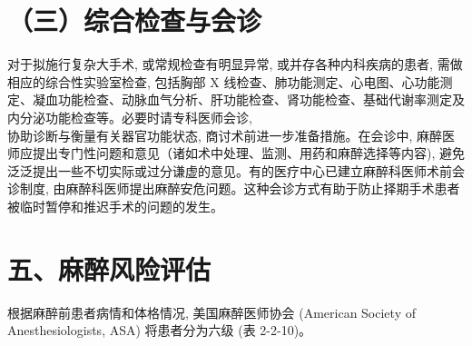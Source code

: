 \documentclass[10pt]{article}
\begin{document}
\section*{（三）综合检查与会诊}
对于拟施行复杂大手术, 或常规检查有明显异常, 或并存各种内科疾病的患者, 需做相应的综合性实验室检查, 包括胸部 X 线检查、肺功能测定、心电图、心功能测定、凝血功能检查、动脉血气分析、肝功能检查、肾功能检查、基础代谢率测定及内分泌功能检查等。必要时请专科医师会诊,\\
协助诊断与衡量有关器官功能状态, 商讨术前进一步准备措施。在会诊中, 麻醉医师应提出专门性问题和意见（诸如术中处理、监测、用药和麻醉选择等内容), 避免泛泛提出一些不切实际或过分谦虚的意见。有的医疗中心已建立麻醉科医师术前会诊制度, 由麻醉科医师提出麻醉安危问题。这种会诊方式有助于防止择期手术患者被临时暂停和推迟手术的问题的发生。

\section*{五、麻醉风险评估}
根据麻醉前患者病情和体格情况, 美国麻醉医师协会 (American Society of Anesthesiologists, ASA) 将患者分为六级 (表 2-2-10)。
\end{document}

